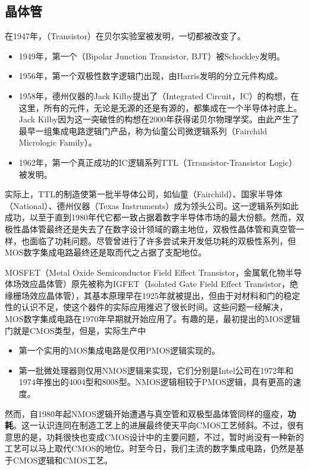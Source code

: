 \subsection{晶体管}
在1947年，（Transistor）在贝尔实验室被发明，一切都被改变了。

\begin{itemize}
    \item 1949年，第一个（Bipolar Junction Transistor, BJT）被Schockley发明。
    \item 1956年，第一个双极性数字逻辑门出现，由Harris发明的分立元件构成。
    \item 1958年，德州仪器的Jack Kilby提出了（Integrated Circuit，IC）的构想，在这里，所有的元件，无论是无源的还是有源的，都集成在一个半导体衬底上。Jack Kilby因为这一突破性的构想在2000年获得诺贝尔物理学奖。由此产生了最早一组集成电路逻辑门产品，称为仙童公司微逻辑系列（Fairchild Micrologic Family）。
    \item 1962年，第一个真正成功的IC逻辑系列TTL（Trransistor-Transistor Logic）被发明。
\end{itemize}
实际上，TTL的制造使第一批半导体公司，如仙童（Fairchild）、国家半导体（National）、德州仪器（Texas Instruments）成为领头公司。这一逻辑系列如此成功，以至于直到1980年代它都一致占据着数字半导体市场的最大份额。然而，双极性晶体管最终还是失去了在数字设计领域的霸主地位，双极性晶体管和真空管一样，也面临了功耗问题。尽管曾进行了许多尝试来开发低功耗的双极性系列，但MOS数字集成电路最终还是取而代之占据了支配地位。

MOSFET（Metal Oxide Semiconductor Field Effect Transistor，金属氧化物半导体场效应晶体管）原先被称为IGFET（Isolated Gate Field Effect Transistor，绝缘栅场效应晶体管），其基本原理早在1925年就被提出，但由于对材料和门的稳定性的认识不足，使这个器件的实际应用推迟了很长时间。这些问题一经解决，MOS数字集成电路在1970年早期就开始应用了。有趣的是，最初提出的MOS逻辑门就是CMOS类型，但是，实际生产中
\begin{itemize}
    \item 第一个实用的MOS集成电路是仅用PMOS逻辑实现的。
    \item 第一批微处理器则仅用NMOS逻辑来实现，它们分别是Intel公司在1972年和1974年推出的4004型和8008型。NMOS逻辑相较于PMOS逻辑，具有更高的速度。
\end{itemize}
然而，自1980年起NMOS逻辑开始遭遇与真空管和双极型晶体管同样的瘟疫，\textbf{功耗}。这一认识连同在制造工艺上的进展最终使天平向CMOS工艺倾斜。不过，很有意思的是，功耗很快也变成CMOS设计中的主要问题，不过，暂时尚没有一种新的工艺可以马上取代CMOS的地位。时至今日，我们主流的数字集成电路，仍然是基于CMOS逻辑和CMOS工艺。

